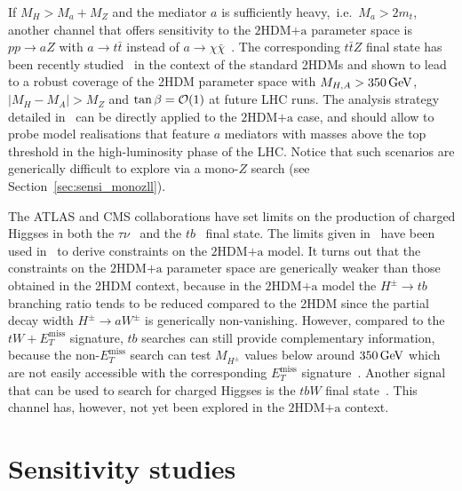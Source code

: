 \documentclass[a4paper, 11pt,notoc]{article}
\newcommand{\MET}{\ensuremath{E_T^\mathrm{miss}}\xspace}
\newcommand{\ma}{\ensuremath{M_{a}}\xspace}
\newcommand{\mH}{\ensuremath{M_{H}}\xspace}
\newcommand{\mHc}{\ensuremath{M_{H^{\pm}}}\xspace}
\newcommand{\hdma}{\ensuremath{\textrm{2HDM+a}}\xspace}
\begin{document}
If $\mH > \ma + M_Z$ and the mediator $a$ is sufficiently heavy,~i.e.~$\ma > 2 m_t$, another channel that offers sensitivity to the  $\hdma$ parameter space is $pp \to aZ$ with $a \to t \bar t$ instead of $a \to \chi \bar \chi$~\cite{GPHeidelberg}. The corresponding $t \bar t Z$ final state has been recently studied~\cite{Haisch:2018djm} in the context of the standard 2HDMs and shown to lead to a robust coverage of the 2HDM parameter space with $M_{H,A} > 350 \, {\rm GeV}$, $|M_H - M_A| > M_Z$ and $\tan \beta = {\cal O} (1)$ at future LHC runs.  The analysis strategy detailed in~\cite{Haisch:2018djm} can be directly applied to the \hdma case, and should allow to probe model realisations that feature $a$ mediators with masses above the top threshold in the high-luminosity phase of the LHC. Notice that such scenarios are generically difficult to explore via a mono-$Z$ search (see Section~\ref{sec:sensi_monozll}).

The ATLAS and CMS collaborations have set limits on the production of charged Higgses in both the $\tau \nu$~\cite{Aaboud:2016dig,CMS-PAS-HIG-16-031} and the $tb$~\cite{Aad:2015typ,Khachatryan:2015qxa,ATLAS:2016qiq} final state. The limits given in~\cite{ATLAS:2016qiq} have been used in~\cite{Pani:2017qyd} to derive constraints on the \hdma model. It turns out that  the constraints on the \hdma parameter space are generically weaker than those obtained in the 2HDM context, because in the \hdma model  the $H^\pm \to tb$ branching ratio tends to be reduced compared to the 2HDM since the partial decay width $H^\pm \to aW^\pm$ is generically non-vanishing.  However, compared to the $tW+\MET$ signature, $tb$ searches can still provide complementary information, because the non-$\MET$  search can test $\mHc$ values below around $350 \, {\rm GeV}$ which are not easily accessible with the corresponding $\MET$ signature~\cite{Pani:2017qyd}. Another signal that can be used to search for charged Higgses is the $tbW$ final state~\cite{Haisch:2018djm}. This channel has, however, not yet been explored in the \hdma context. 


\section{Sensitivity studies}
\label{sec:sensitivitystudies}
\end{document}
